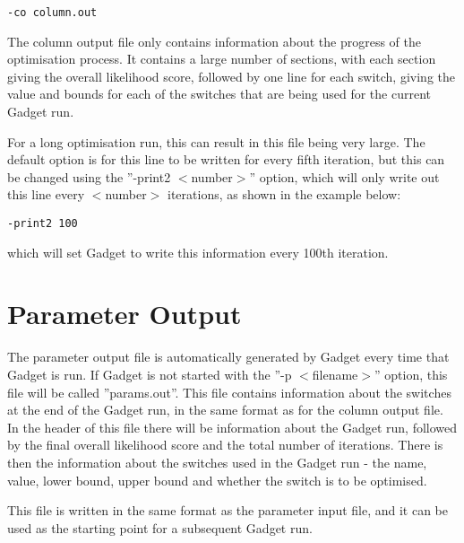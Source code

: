 \documentclass [a4paper, 10pt]{book}
\begin{document}
{\small\begin{verbatim}
-co column.out
\end{verbatim}}

The column output file only contains information about the progress of the optimisation process.  It contains a large number of sections, with each section giving the overall likelihood score, followed by one line for each switch, giving the value and bounds for each of the switches that are being used for the current Gadget run.

\bigskip
For a long optimisation run, this can result in this file being very large.  The default option is for this line to be written for every fifth iteration, but this can be changed using the ''-print2 $<$number$>$'' option, which will only write out this line every $<$number$>$ iterations, as shown in the example below:

{\small\begin{verbatim}
-print2 100
\end{verbatim}}

which will set Gadget to write this information every 100th iteration.

\section{Parameter Output}\label{sec:paramoutput}
The parameter output file is automatically generated by Gadget every time that Gadget is run.  If Gadget is not started with the ''-p $<$filename$>$'' option, this file will be called ''params.out''.  This file contains information about the switches at the end of the Gadget run, in the same format as for the column output file.  In the header of this file there will be information about the Gadget run, followed by the final overall likelihood score and the total number of iterations.  There is then the information about the switches used in the Gadget run - the name, value, lower bound, upper bound and whether the switch is to be optimised.

\bigskip
This file is written in the same format as the parameter input file, and it can be used as the starting point for a subsequent Gadget run.
\end{document}
